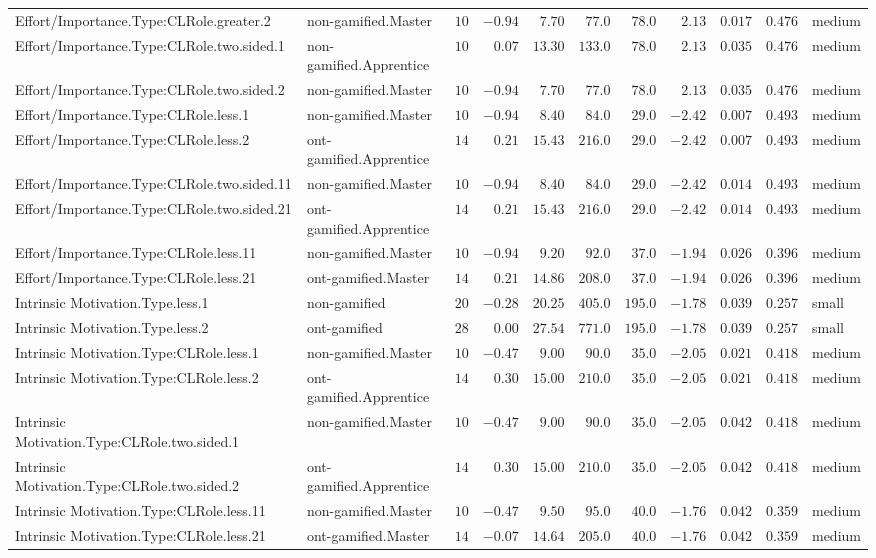 \documentclass[6pt,a4paper]{article}
\begin{document}
\begin{landscape}
{\begin{longtable}{llrrrrrrrrl}
Effort/Importance.Type:CLRole.greater.2&non-gamified.Master&$10$&$-0.94$&$ 7.70$&$ 77.0$&$ 78.0$&$ 2.13$&$0.017$&$0.476$&medium\tabularnewline
Effort/Importance.Type:CLRole.two.sided.1&non-gamified.Apprentice&$10$&$ 0.07$&$13.30$&$133.0$&$ 78.0$&$ 2.13$&$0.035$&$0.476$&medium\tabularnewline
Effort/Importance.Type:CLRole.two.sided.2&non-gamified.Master&$10$&$-0.94$&$ 7.70$&$ 77.0$&$ 78.0$&$ 2.13$&$0.035$&$0.476$&medium\tabularnewline
Effort/Importance.Type:CLRole.less.1&non-gamified.Master&$10$&$-0.94$&$ 8.40$&$ 84.0$&$ 29.0$&$-2.42$&$0.007$&$0.493$&medium\tabularnewline
Effort/Importance.Type:CLRole.less.2&ont-gamified.Apprentice&$14$&$ 0.21$&$15.43$&$216.0$&$ 29.0$&$-2.42$&$0.007$&$0.493$&medium\tabularnewline
Effort/Importance.Type:CLRole.two.sided.11&non-gamified.Master&$10$&$-0.94$&$ 8.40$&$ 84.0$&$ 29.0$&$-2.42$&$0.014$&$0.493$&medium\tabularnewline
Effort/Importance.Type:CLRole.two.sided.21&ont-gamified.Apprentice&$14$&$ 0.21$&$15.43$&$216.0$&$ 29.0$&$-2.42$&$0.014$&$0.493$&medium\tabularnewline
Effort/Importance.Type:CLRole.less.11&non-gamified.Master&$10$&$-0.94$&$ 9.20$&$ 92.0$&$ 37.0$&$-1.94$&$0.026$&$0.396$&medium\tabularnewline
Effort/Importance.Type:CLRole.less.21&ont-gamified.Master&$14$&$ 0.21$&$14.86$&$208.0$&$ 37.0$&$-1.94$&$0.026$&$0.396$&medium\tabularnewline
Intrinsic Motivation.Type.less.1&non-gamified&$20$&$-0.28$&$20.25$&$405.0$&$195.0$&$-1.78$&$0.039$&$0.257$&small\tabularnewline
Intrinsic Motivation.Type.less.2&ont-gamified&$28$&$ 0.00$&$27.54$&$771.0$&$195.0$&$-1.78$&$0.039$&$0.257$&small\tabularnewline
Intrinsic Motivation.Type:CLRole.less.1&non-gamified.Master&$10$&$-0.47$&$ 9.00$&$ 90.0$&$ 35.0$&$-2.05$&$0.021$&$0.418$&medium\tabularnewline
Intrinsic Motivation.Type:CLRole.less.2&ont-gamified.Apprentice&$14$&$ 0.30$&$15.00$&$210.0$&$ 35.0$&$-2.05$&$0.021$&$0.418$&medium\tabularnewline
Intrinsic Motivation.Type:CLRole.two.sided.1&non-gamified.Master&$10$&$-0.47$&$ 9.00$&$ 90.0$&$ 35.0$&$-2.05$&$0.042$&$0.418$&medium\tabularnewline
Intrinsic Motivation.Type:CLRole.two.sided.2&ont-gamified.Apprentice&$14$&$ 0.30$&$15.00$&$210.0$&$ 35.0$&$-2.05$&$0.042$&$0.418$&medium\tabularnewline
Intrinsic Motivation.Type:CLRole.less.11&non-gamified.Master&$10$&$-0.47$&$ 9.50$&$ 95.0$&$ 40.0$&$-1.76$&$0.042$&$0.359$&medium\tabularnewline
Intrinsic Motivation.Type:CLRole.less.21&ont-gamified.Master&$14$&$-0.07$&$14.64$&$205.0$&$ 40.0$&$-1.76$&$0.042$&$0.359$&medium\tabularnewline
\hline
\end{longtable}}

\end{landscape}
\end{document}

